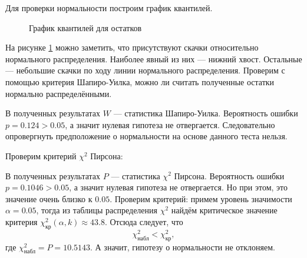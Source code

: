 Для проверки нормальности построим график квантилей.
\begin{figure}[ht]
\caption{График квантилей для остатков}
\label{img:resid_qqnorm}
\end{figure}
На рисунке \ref{img:resid_qqnorm} можно заметить, что присутствуют скачки относительно нормального распределения. Наиболее явный из них --- нижний хвост. Остальные --- небольшие скачки по ходу линии нормального распределения. Проверим с помощью критерия Шапиро-Уилка, можно ли считать полученные остатки нормально распределёнными.

В полученных результатах $W$ --- статистика Шапиро-Уилка. Вероятность ошибки $p = 0.124 > 0.05$, а значит нулевая гипотеза не отвергается. Следовательно опровергнуть предположение о нормальности на основе данного теста нельзя.

\bigskip
\bigskip
Проверим критерий $\chi^2$ Пирсона:
\bigskip

В полученных результатах $P$ --- статистика $\chi^2$ Пирсона. Вероятность ошибки $p = 0.1046 > 0.05$, а значит нулевая гипотеза не отвергается. Но при этом, это значение очень близко к $0.05$. Проверим критерий: примем уровень значимости $\alpha = 0.05$, тогда из таблицы распределения $\chi^2$ найдём критическое значение критерия $\chi_{\textrm{кр}}^2(\alpha, k) \approx 43.8$. Отсюда следует, что
\begin{equation*}
	\chi_{\textrm{набл}}^2 < \chi_{\textrm{кр}}^2,
\end{equation*}
где $\chi_{\textrm{набл}}^2 = P = 10.5143$. А значит, гипотезу о нормальности не отклоняем.

